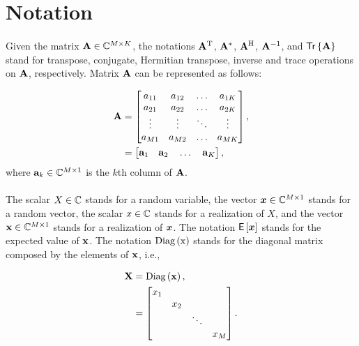 

\section{Notation}


\paragraph{}Given the matrix $\mathbf{A} \in \mathbb{C}^{M \times K}$, the notations $\mathbf{A}^{\mathrm{T}}$, $\mathbf{A}^{*}$, $\mathbf{A}^{\mathrm{H}}$, $\mathbf{A}^{-1}$, and  $ \mathsf{Tr} \left\lbrace \mathbf{A} \right\rbrace $ stand for transpose, conjugate, Hermitian transpose,  inverse and  trace operations on $\mathbf{A}$, respectively. Matrix $\mathbf{A}$ can be represented as follows: 

\begin{align*}
\mathbf{A} &= \begin{bmatrix}
a_{11} & a_{12} & \hdots & a_{1K} \\
a_{21} & a_{22} & \hdots & a_{2K} \\
\vdots & \vdots & \ddots & \vdots \\
a_{M1} & a_{M2} & \hdots & a_{MK} 
\end{bmatrix}, \\
& = \begin{bmatrix} \mathbf{a}_{1} \quad \mathbf{a}_{2} \quad \hdots \quad \mathbf{a}_{K} \end{bmatrix},
\end{align*}
where $\mathbf{a}_{k} \in \mathbb{C}^{M \times 1}$ is the $k$th column of $\mathbf{A}$.

\paragraph{}The scalar $X \in \mathbb{C}$ stands for a random variable, the vector $\boldsymbol{x} \in \mathbb{C}^{M \times 1}$ stands for a random vector, the scalar $x \in \mathbb{C}$ stands for a realization of $X$, and the vector $\mathbf{x} \in \mathbb{C}^{M \times 1}$ stands for a realization of $\boldsymbol{x}$. The notation $ \mathsf{E} \left[ \boldsymbol{x} \right] $ stands for the expected value of $\mathbf{x}$. The notation $ \textrm{Diag} \left( \mathrm{x} \right) $ stands for the diagonal matrix composed by the elements of $\mathbf{x}$, i.e.,

\begin{align*}
\mathbf{X} &=  \textrm{Diag} \left( \mathbf{x} \right) , \\
&= \begin{bmatrix}
x_{1} &  &  & \\
& x_{2} & &  \\
 & & \ddots &  \\
 & & & x_{M} 
\end{bmatrix}. \\
\end{align*}
